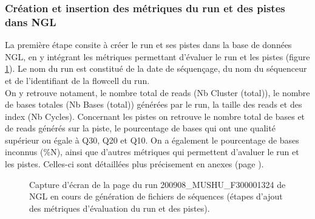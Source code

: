 \subsubsection*{Création et insertion des métriques du run et des pistes dans NGL }
La première étape consite à créer le run et ses pistes dans la base de données NGL, en y intégrant les métriques permettant d'évaluer le run et les pistes (figure \ref{NGL-screenshot_run-lane}).
Le nom du run est constitué de la date de séquençage, du nom du séquenceur et de l'identifiant de la flowcell du run.\\

On y retrouve notament, le nombre total de reads (Nb Cluster (total)), le nombre de bases totales (Nb Bases (total)) générées par le run, la taille des reads et des index (Nb Cycles).
Concernant les pistes on retrouve le nombre total de bases et de reads générés sur la piste, le pourcentage de bases qui ont une qualité supérieur ou égale à Q30, Q20 et Q10. On a également le pourcentage de bases inconnus (\%N), ainsi que d'autres métriques qui permettent d'avaluer le run et les pistes. Celles-ci sont détaillées plus précisement en anexes (page \pageref{anexes1}).\\

\begin{figure}[H]
    \centering
    \caption{\footnotesize{Capture d'écran de la page du run 200908\_MUSHU\_F300001324 de NGL en cours de génération de fichiers de séquences (étapes d'ajout des métriques d'évaluation du run et des pistes).}}
    \label{NGL-screenshot_run-lane}
\end{figure}

